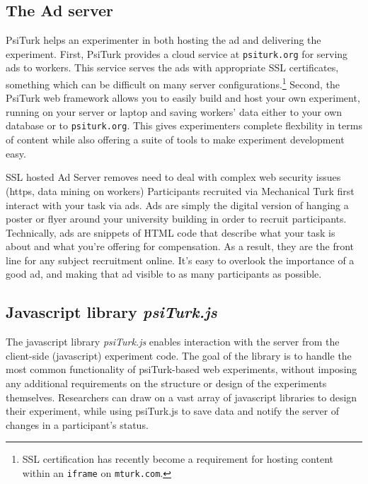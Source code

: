 \documentclass[twocolumn]{svjour3}          %
\begin{document}
\subsection{The Ad server}

PsiTurk helps an experimenter in both hosting the ad and delivering the experiment.
First, PsiTurk provides a cloud service at \texttt{psiturk.org} for serving ads to workers.
This service serves the ads with appropriate SSL certificates, something which can be difficult on many server configurations.\footnote{SSL certification has recently become a requirement for hosting content within an \texttt{iframe} on \texttt{mturk.com}.}
Second, the PsiTurk web framework allows you to easily build and host your own experiment, running on your server or laptop and saving workers' data either to your own database  or to \texttt{psiturk.org}.
This gives experimenters complete flexbility in terms of content while also offering a suite of tools to make experiment development easy.

SSL hosted Ad Server removes need to deal with complex web security issues (https, data mining on workers) 
Participants recruited via Mechanical Turk first interact with your task via ads. Ads are simply the digital version of hanging a poster or flyer around your university building in order to recruit participants. Technically, ads are snippets of HTML code that describe what your task is about and what you're offering for compensation. As a result, they are the front line for any subject recruitment online. It's easy to overlook the importance of a good ad, and making that ad visible to as many participants as possible.




%
%
%
%
%



\subsection{Javascript library \emph{psiTurk.js}}

The javascript library \emph{psiTurk.js} enables interaction with the server from the client-side (javascript) experiment code.
The goal of the library is to handle the most common functionality of psiTurk-based web experiments, without imposing any additional requirements on the structure or design of the experiments themselves.
Researchers can draw on a vast array of javascript libraries to design their experiment, while using psiTurk.js to save data and notify the server of changes in a participant's status.
\end{document}
